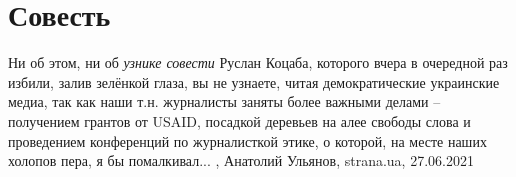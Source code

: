  
 
 
 
 
\chapter{Совесть}
\label{sec:slova.sovestj}

Ни об этом, ни об \emph{узнике совести} Руслан Коцаба, которого вчера в очередной раз
избили, залив зелёнкой глаза, вы не узнаете, читая демократические украинские
медиа, так как наши т.н. журналисты заняты более важными делами – получением
грантов от USAID, посадкой деревьев на алее свободы слова и проведением
конференций по журналисткой этике, о которой, на месте наших холопов пера, я бы
помалкивал...
, 
Анатолий Ульянов, strana.ua, 27.06.2021

